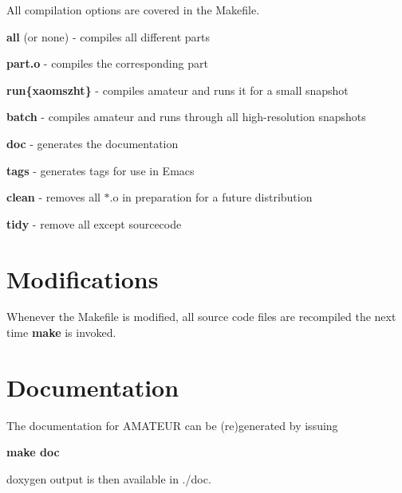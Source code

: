 All compilation options are covered in the Makefile.


\begin{DoxyItemize}
\item {\bfseries all} (or none) -\/ compiles all different parts
\item {\bfseries part.o} -\/ compiles the corresponding part
\item {\bfseries run\{xaomszht\}} -\/ compiles amateur and runs it for a small snapshot
\item {\bfseries batch} -\/ compiles amateur and runs through all high-\/resolution snapshots
\item {\bfseries doc} -\/ generates the documentation
\item {\bfseries tags} -\/ generates tags for use in Emacs
\item {\bfseries clean} -\/ removes all $\ast$.o in preparation for a future distribution
\item {\bfseries tidy} -\/ remove all except sourcecode
\end{DoxyItemize}\hypertarget{AMATEUR-Makefile_modifications}{}\section{Modifications}\label{AMATEUR-Makefile_modifications}
Whenever the Makefile is modified, all source code files are recompiled the next time {\bfseries make} is invoked.\hypertarget{AMATEUR-Makefile_doc}{}\section{Documentation}\label{AMATEUR-Makefile_doc}
The documentation for AMATEUR can be (re)generated by issuing

{\bfseries  make doc }

doxygen output is then available in ./doc. 
